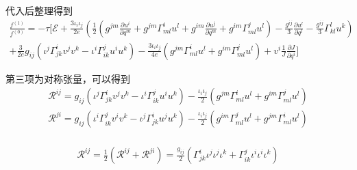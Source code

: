 \documentclass[LBMDerivation.tex]{subfiles}
\begin{document}


代入后整理得到
\begin{equation}
  \begin{gathered}
    \frac{f^{(1)}}{f^{(0)}}=
    -\tau [\mathcal{E}
      +\frac{3\iota_i \iota_j}{2e}(\frac{1}{2} (g^{jm} \frac{\partial u^i}{\partial q^m}+g^{jm}\Gamma_{ml}^i u^l+g^{im} \frac{\partial u^j}{\partial q^m}+g^{im}\Gamma_{ml}^j u^l) -\frac{g^{ij}}{3}\frac{\partial u^l}{\partial q^l}-\frac{g^{ij}}{3} \Gamma_{kl}^l u^k) \\
      + \frac{3}{2e} g_{ij} (\iota^j\Gamma_{j k}^{i} v^j v^k - \iota^i\Gamma_{i k}^{j} u^i u^k) - \frac{3\iota_i\iota_j}{4e}(g^{jm}\Gamma_{ml}^i u^l + g^{im}\Gamma_{ml}^j u^l) + v^i  \frac{1}{J}\frac{\partial J}{\partial q^i}
    ]
  \end{gathered}
\end{equation}



第三项为对称张量，可以得到
\begin{equation}
  \begin{gathered}
    \mathcal{R}^{ij} =g_{ij} (\iota^j\Gamma_{j k}^{i} v^j v^k - \iota^i\Gamma_{i k}^{j} u^i u^k) - \frac{\iota_i\iota_j}{2}(g^{jm}\Gamma_{ml}^i u^l + g^{im}\Gamma_{ml}^j u^l) \\
    \mathcal{R}^{ji}= g_{ij} (\iota^i\Gamma_{i k}^{j} v^i v^k - \iota^j \Gamma_{j k}^{i} u^j u^k) - \frac{\iota_i\iota_j}{2}(g^{im}\Gamma_{ml}^j u^l + g^{jm}\Gamma_{ml}^i u^l) \\
  \end{gathered}
\end{equation}

\begin{equation}
  \begin{gathered}
    \mathcal{R}^{ij} = \frac{1}{2}(\mathcal{R}^{ij}+\mathcal{R}^{ji})=\frac{g_{ij}}{2}(\Gamma_{jk}^i \iota^j\iota^j\iota^k + \Gamma_{ik}^j \iota^i\iota^i\iota^k )
  \end{gathered}
\end{equation}
\end{document}
